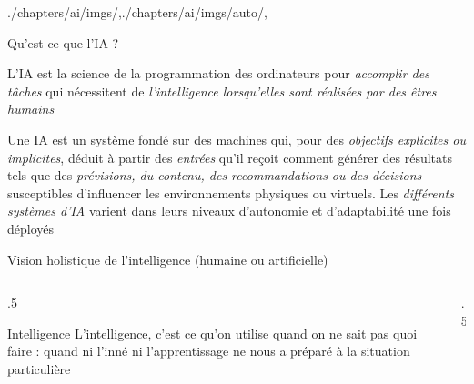 \begin{graphicspathcontext}{{./chapters/ai/imgs/},{./chapters/ai/imgs/auto/},\old}

\begin{frame}[c]{Qu'est-ce que l'IA ?}
	\begin{definition}
		L'IA est la science de la programmation des ordinateurs pour \emph{accomplir des tâches} qui nécessitent de \emph{l'intelligence lorsqu'elles sont réalisées par des êtres humains}
	\end{definition}
	\vspace{1cm}
	\begin{definition}[de l'OCDE]
		Une IA est un système fondé sur des machines qui, pour des \emph{objectifs explicites ou implicites}, déduit à partir des \emph{entrées} qu'il reçoit comment générer des résultats tels que des \emph{prévisions, du contenu, des recommandations ou des décisions} susceptibles d'influencer les environnements physiques ou virtuels. Les \emph{différents systèmes d'IA} varient dans leurs niveaux d'autonomie et d'adaptabilité une fois déployés
	\end{definition}
\end{frame}

\begin{frame}[c]{Vision holistique de l'intelligence (humaine ou artificielle)}
	\begin{columns}
		\begin{column}{.5\linewidth}
			\begin{definitionblock}{Intelligence \cite{piaget1947psychologie}}
				L'intelligence, c'est ce qu'on utilise quand on ne sait pas quoi faire : quand ni l'inné ni l'apprentissage ne nous a préparé à la situation particulière
			\end{definitionblock}
		\end{column}
		\begin{column}{.5\linewidth}
			\hfill
			 \\[.5cm]
			\hfill
		\end{column}
	\end{columns}
\end{frame}



\end{graphicspathcontext}

\endinput

